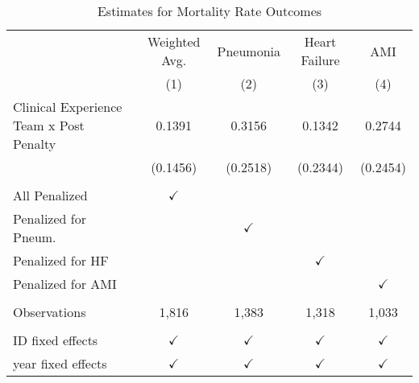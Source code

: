 \begin{table}
\caption{Estimates for Mortality Rate Outcomes}
\begin{tabular}{lcccc}
\toprule
 & Weighted Avg. & Pneumonia & Heart Failure & AMI\\
 & (1) & (2) & (3) & (4)\\
\midrule Clinical Experience Team x Post Penalty & 0.1391 & 0.3156 & 0.1342 & 0.2744\\
  & (0.1456) & (0.2518) & (0.2344) & (0.2454)\\
  \\
All Penalized & $\checkmark$ &  &  & \\
Penalized for Pneum. &  & $\checkmark$ &  & \\
Penalized for HF &  &  & $\checkmark$ & \\
Penalized for AMI &  &  &  & $\checkmark$\\
  &   &   &   &  \\
Observations & 1,816 & 1,383 & 1,318 & 1,033\\
  &   &   &   &  \\
ID fixed effects & $\checkmark$ & $\checkmark$ & $\checkmark$ & $\checkmark$\\
year fixed effects & $\checkmark$ & $\checkmark$ & $\checkmark$ & $\checkmark$\\
\bottomrule
\end{tabular}
\label{tab:mort_results}
\end{table}